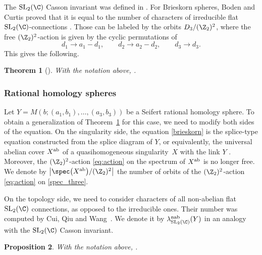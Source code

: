 \documentclass[10pt,a4paper]{amsart}
\newtheorem{Theorem}{Theorem}[section]
\newtheorem{Proposition}[Theorem]{Proposition}
\begin{document}
The $\operatorname{SL}_2(\C)$ Casson invariant  was defined in \cite{Cu01}. For Brieskorn spheres, Boden and Curtis proved that it is equal to the number of characters of irreducible flat $\operatorname{SL}_2(\C)$-connections \cite{BC06}. Those can be labeled by the orbits $D_3/(\Z_2)^2$, where the free $(\Z_2)^2$-action is given by the cyclic permutations of
\begin{equation}\label{eq:action}
d_1 \to a_1 - d_1, \qquad d_2 \to a_2 - d_2, \qquad d_3 \to d_3.
\end{equation}
This gives the following.

\begin{Theorem}[{\cite[Theorem~2.4]{BC06}}]\label{CassonMilnor}
With the notation above,
.
\end{Theorem}

\subsubsection{Rational homology spheres}

Let $Y = M(b;(a_1, b_1), \dots, (a_3,b_3))$ be a Seifert rational homology sphere. To obtain a generalization of Theorem~\ref{CassonMilnor} for this case, we need to modify both sides of the equation. On the singularity side, the equation \eqref{brieskorn} is the splice-type equation constructed from the splice diagram of $Y$, or equivalently, the universal abelian cover $X^{\rm ab}$ of a quasihomogeneous singularity~$X$ with the link $Y$ \cite{Neu83}. Moreover, the $(\Z_2)^2$-action \eqref{eq:action} on the spectrum of $X^{\rm ab}$ is no longer free. We denote by $\bigl\lvert\spec\bigl(X^{\rm ab}\bigr)/(\Z_2)^2\bigr\rvert$ the number of orbits of the $(\Z_2)^2$-action \eqref{eq:action} on \eqref{spec_three}.

On the topology side, we need to consider characters of all non-abelian flat $\operatorname{SL}_2(\C)$ connections, as opposed to the irreducible ones. Their number was computed by Cui, Qiu and Wang~\cite{CuQiWa21}. We denote it by $\lambda^{\rm nab}_{\operatorname{SL}_2(\C)}(Y)$ in an analogy with the $\operatorname{SL}_2(\C)$ Casson invariant.

\begin{Proposition}\label{prop:rat_sph_spec}
With the notation above,
.
\end{Proposition}
\end{document}
